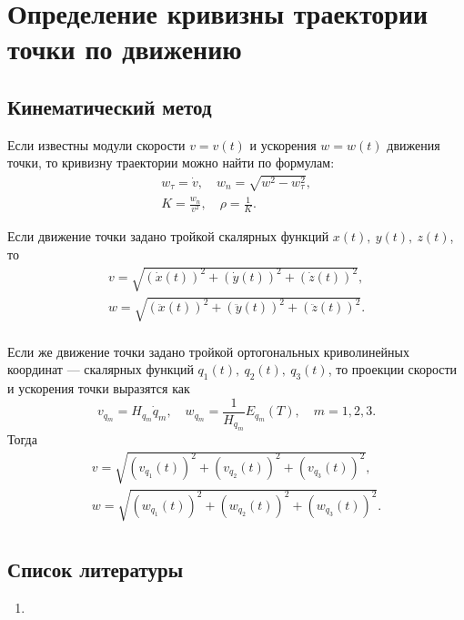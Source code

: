 \section{Определение кривизны траектории точки по движению}

\subsection{Кинематический метод}

Если известны модули скорости $v = v(t)$ и ускорения $w = w(t)$ движения точки,
то кривизну траектории можно найти по формулам:
\begin{equation}
  \begin{gathered}
    w_\tau = \dot{v}, \quad w_n = \sqrt{w^2 - w_\tau^2}, \\
    K = \frac{w_n}{v^2}, \quad \rho = \frac{1}{K}.
  \end{gathered}
\end{equation}

Если движение точки задано тройкой скалярных функций $x(t),~y(t),~z(t)$, то
\begin{equation}
  \begin{gathered}
    v = \sqrt{(\dot{x}(t))^2 + (\dot{y}(t))^2 + (\dot{z}(t))^2}, \\
    w = \sqrt{(\ddot{x}(t))^2 + (\ddot{y}(t))^2 + (\ddot{z}(t))^2}. \\
  \end{gathered}
\end{equation}

Если же движение точки задано тройкой ортогональных криволинейных координат
--- скалярных функций $q_1(t),~q_2(t),~q_3(t)$, то проекции скорости и
ускорения точки выразятся как
\begin{equation*}
  v_{q_m} = H_{q_m} \dot{q}_m, \quad w_{q_m} = \frac{1}{H_{q_m}} E_{q_m} (T),
    \quad m = 1,2,3.
\end{equation*}
Тогда
\begin{equation}
  \begin{gathered}
    v = \sqrt{(v_{q_1}(t))^2 + (v_{q_2}(t))^2 + (v_{q_3}(t))^2}, \\
    w = \sqrt{(w_{q_1}(t))^2 + (w_{q_2}(t))^2 + (w_{q_3}(t))^2}. \\
  \end{gathered}
\end{equation}

\subsection{Список литературы}
\begin{enumerate}
  \item \cite{lectures}
\end{enumerate}

